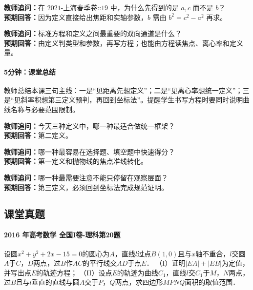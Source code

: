\documentclass[UTF8,a4paper,11pt]{ctexart}
\begin{document}
\noindent\textbf{教师追问：}在 $\text{2021-上海春季卷::19}$ 中，为什么先得到的是 $a,c$ 而不是 $b$？\\

\textbf{预期回答：}因为定义直接给出焦距和实轴参数，$b$ 需由 $b^2=c^2-a^2$ 再求。\par

\noindent\textbf{教师追问：}标准方程和定义之间最重要的双向通道是什么？\\

\textbf{预期回答：}由定义判类型和参数，再写方程；也能由方程读焦点、离心率和定义量。\par

\paragraph{5分钟：课堂总结}

教师总结本课三句主线：一是“见距离先想定义”；二是“见离心率想统一定义”；三是“见斜率积想第三定义预判，再回到坐标法”。提醒学生书写方程时要同时说明曲线名称与必要范围限制。

\noindent\textbf{教师追问：}今天三种定义中，哪一种最适合做统一框架？\\

\textbf{预期回答：}第二定义。\par

\noindent\textbf{教师追问：}哪一种最容易在选择题、填空题中快速得分？\\

\textbf{预期回答：}第一定义和抛物线的焦点准线转化。\par

\noindent\textbf{教师追问：}哪一种最需要注意不能只停留在观察层面？\\

\textbf{预期回答：}第三定义，必须回到坐标法完成规范证明。\par

\subsection*{课堂真题}

\paragraph{2016 年高考数学 全国I卷-理科第20题}

设圆$x^2+y^2+2x-15=0$的圆心为$A$，直线$l$过点$B(1,0)$且与$x$轴不重合，$l$交圆$A$于$C$，$D$两点，过$B$作$AC$的平行线交$AD$于点$E$．
（I）证明$|EA|+|EB|$为定值，并写出点$E$的轨迹方程；
（II）设点$E$的轨迹为曲线$C_1$，直线$l$交$C_1$于$M$，$N$两点，过$B$且与$l$垂直的直线与圆$A$交于$P$，$Q$两点，求四边形$MPNQ$面积的取值范围．
\end{document}
